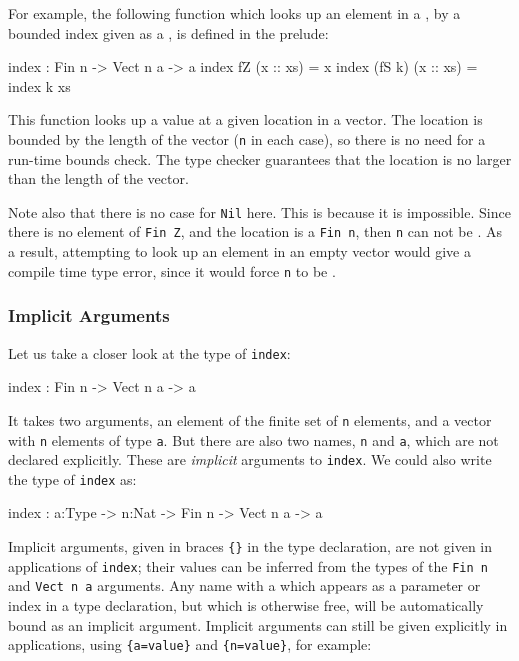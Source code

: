 For example, the following function which looks up an element in a , by a bounded index given as a , is defined in the prelude:

\begin{code}
index : Fin n -> Vect n a -> a
index fZ     (x :: xs) = x
index (fS k) (x :: xs) = index k xs
\end{code}

\noindent
This function looks up a value at a given location in a vector.
The location is bounded by the length of the vector (\texttt{n} in each case), so there is no
need for a run-time bounds check.
The type checker guarantees that the location is no larger than the length of the vector.

Note also that there is no case for \texttt{Nil} here.
This is because it is impossible. Since there is no element of \texttt{Fin Z}, and the location is a \texttt{Fin n}, then \texttt{n} can not be . 
As a result, attempting to look up an element in an empty vector would give a compile time type error, since it would force \texttt{n} to be .

\subsubsection{Implicit Arguments}

Let us take a closer look at the type of \texttt{index}:

\begin{code}
index : Fin n -> Vect n a -> a
\end{code}

\noindent
It takes two arguments, an element of the finite set of \texttt{n} elements, and a vector with \texttt{n} elements of type \texttt{a}. But there are also two names, \texttt{n} and \texttt{a}, which are not declared  explicitly.
These are \emph{implicit} arguments to \texttt{index}. We could also write the type of \texttt{index} as:

\begin{code}
index : {a:Type} -> {n:Nat} -> Fin n -> Vect n a -> a
\end{code}

\noindent
Implicit arguments, given in braces \texttt{\{\}} in the type declaration, are not given in applications of \texttt{index}; their values can be inferred from the types of the \texttt{Fin n} and \texttt{Vect n a} arguments.
Any name with a  which appears as a parameter or index in a type declaration, but which is otherwise free, will be automatically bound as an implicit argument.
Implicit arguments can still be given explicitly in applications, using \texttt{\{a=value\}} and \texttt{\{n=value\}}, for example:

